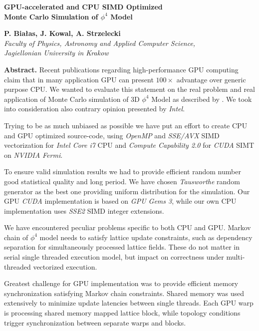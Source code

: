 \documentclass[11pt,a4paper]{article}
\begin{document}
\begin{samepage}
\begin{center}
{\Large{\bf GPU-accelerated and CPU SIMD Optimized \\ Monte Carlo Simulation of $\phi^4$ Model }}

\vspace {5mm}
{\bf P. Białas, J. Kowal, A. Strzelecki}\\
{\em Faculty of Physics, Astronomy and Applied Computer Science, \\ Jagiellonian University in Krakow }\\

\end{center}
\end{samepage}

{\bf Abstract.} Recent publications regarding high-performance GPU computing claim that in many application GPU can present $100\times$ advantage over generic purpose CPU. We wanted to evaluate this statement on the real problem and real application of Monte Carlo simulation of 3D $\phi^4$ Model as described by \cite{PhysRevE.64.066113}. We took into consideration also contrary opinion presented by \emph{Intel}\cite{Lee:2010:DGV:1816038.1816021}.

Trying to be as much unbiased as possible we have put an effort to create CPU and GPU optimized source-code, using \emph{OpenMP} and \emph{SSE/AVX} SIMD vectorization for \emph{Intel Core i7} CPU and \emph{Compute Capability 2.0} for \emph{CUDA} SIMT on \emph{NVIDIA Fermi}\cite{Preis20094468}.

To ensure valid simulation results we had to provide efficient random number good statistical quality and long period. We have chosen \emph{Tausworthe} random generator\cite{LEcuyer96} as the best one providing uniform distribution for the simulation. Our GPU \emph{CUDA} implementation is based on \emph{GPU Gems 3}\cite{howes_thomas07}, while our own CPU implementation uses \emph{SSE2} SIMD integer extensions.

We have encountered peculiar problems specific to both CPU and GPU. Markov chain of $\phi^4$ model needs to satisfy lattice update constraints, such as dependency separation for simultaneously processed lattice fields. These do not matter in serial single threaded execution model, but impact on correctness under multi-threaded vectorized execution.

Greatest challenge for GPU implementation was to provide efficient memory synchronization satisfying Markov chain constraints. Shared memory was used extensively to minimize update latencies between single threads. Each GPU warp is processing shared memory mapped lattice block, while topology conditions trigger synchronization between separate warps and blocks.
\end{document}

